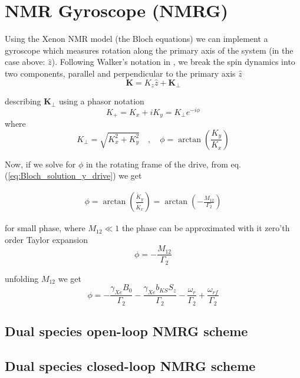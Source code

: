 \documentclass{article}
\begin{document}
\section{NMR Gyroscope (NMRG)}
Using the Xenon NMR model (the Bloch equations) we can implement a gyroscope which measures rotation along the primary axis of the system (in the case above: $\hat{z}$). 
Following Walker's notation in \cite{walker2016spin}, we break the spin dynamics into two components, parallel and perpendicular to the primary axis $\hat{z}$  $$\mathbf{K}=K_z\hat{z}+\mathbf{K}_{\perp}$$

describing $\mathbf{K}_{\perp}$ using a phasor notation
$$K_{+} = K_x + iK_y = K_{\perp}e^{-i\phi}$$
where $$K_{\perp}=\sqrt{K_x^2+K_y^2}\quad, \quad \phi=\arctan{\left(\frac{K_y}{K_x}\right)}$$


Now, if we solve for $\phi$ in the rotating frame of the drive, from eq.(\ref{eq:Bloch_solution_y_drive}) we get

\begin{align}
    \phi = \arctan{\left(\frac{\tilde{K}_y}{\tilde{K}_x}\right)}=\arctan{\left(-\frac{M_{12}}{\Gamma_2}\right)}
\end{align}

for small phase, where $M_{12}\ll 1$ the phase can be approximated with it zero'th order Taylor expansion $$\phi= -\frac{M_{12}}{\Gamma_2}$$

unfolding $M_{12}$ we get
$$\phi= -\frac{\gamma_{Xe}B_0}{\Gamma_2}-\frac{\gamma_{Xe}b_{KS}S_z}{\Gamma_2}-\frac{\omega_r}{\Gamma_2}+\frac{\omega_{rf}}{\Gamma_2}$$

\subsection{Dual species open-loop NMRG scheme}

\subsection{Dual species closed-loop NMRG scheme}




\end{document}
